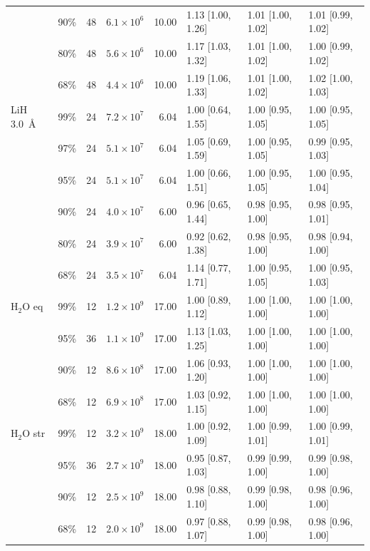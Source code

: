 \documentclass[11pt]{article}
\begin{document}
\begin{table}[!htb]
{\begin{tabular}{lrrrrlll}
 & 90\% & 48 & $6.1\times10^{6}$ & 10.00 & 1.13 [1.00, 1.26] & 1.01 [1.00, 1.02] & 1.01 [0.99, 1.02] \\
 & 80\% & 48 & $5.6\times10^{6}$ & 10.00 & 1.17 [1.03, 1.32] & 1.01 [1.00, 1.02] & 1.00 [0.99, 1.02] \\
 & 68\% & 48 & $4.4\times10^{6}$ & 10.00 & 1.19 [1.06, 1.33] & 1.01 [1.00, 1.02] & 1.02 [1.00, 1.03] \\
\midrule
LiH 3.0~\AA & 99\% & 24 & $7.2\times10^{7}$ & 6.04 & 1.00 [0.64, 1.55] & 1.00 [0.95, 1.05] & 1.00 [0.95, 1.05] \\
 & 97\% & 24 & $5.1\times10^{7}$ & 6.04 & 1.05 [0.69, 1.59] & 1.00 [0.95, 1.05] & 0.99 [0.95, 1.03] \\
 & 95\% & 24 & $5.1\times10^{7}$ & 6.04 & 1.00 [0.66, 1.51] & 1.00 [0.95, 1.05] & 1.00 [0.95, 1.04] \\
 & 90\% & 24 & $4.0\times10^{7}$ & 6.00 & 0.96 [0.65, 1.44] & 0.98 [0.95, 1.00] & 0.98 [0.95, 1.01] \\
 & 80\% & 24 & $3.9\times10^{7}$ & 6.00 & 0.92 [0.62, 1.38] & 0.98 [0.95, 1.00] & 0.98 [0.94, 1.00] \\
 & 68\% & 24 & $3.5\times10^{7}$ & 6.04 & 1.14 [0.77, 1.71] & 1.00 [0.95, 1.05] & 1.00 [0.95, 1.03] \\
\midrule
H$_2$O eq & 99\% & 12 & $1.2\times10^{9}$ & 17.00 & 1.00 [0.89, 1.12] & 1.00 [1.00, 1.00] & 1.00 [1.00, 1.00] \\
 & 95\% & 36 & $1.1\times10^{9}$ & 17.00 & 1.13 [1.03, 1.25] & 1.00 [1.00, 1.00] & 1.00 [1.00, 1.00] \\
 & 90\% & 12 & $8.6\times10^{8}$ & 17.00 & 1.06 [0.93, 1.20] & 1.00 [1.00, 1.00] & 1.00 [1.00, 1.00] \\
 & 68\% & 12 & $6.9\times10^{8}$ & 17.00 & 1.03 [0.92, 1.15] & 1.00 [1.00, 1.00] & 1.00 [1.00, 1.00] \\
\midrule
H$_2$O str & 99\% & 12 & $3.2\times10^{9}$ & 18.00 & 1.00 [0.92, 1.09] & 1.00 [0.99, 1.01] & 1.00 [0.99, 1.01] \\
 & 95\% & 36 & $2.7\times10^{9}$ & 18.00 & 0.95 [0.87, 1.03] & 0.99 [0.99, 1.00] & 0.99 [0.98, 1.00] \\
 & 90\% & 12 & $2.5\times10^{9}$ & 18.00 & 0.98 [0.88, 1.10] & 0.99 [0.98, 1.00] & 0.98 [0.96, 1.00] \\
 & 68\% & 12 & $2.0\times10^{9}$ & 18.00 & 0.97 [0.88, 1.07] & 0.99 [0.98, 1.00] & 0.98 [0.96, 1.00] \\
\bottomrule
\end{tabular}}
\end{table}
\end{document}
